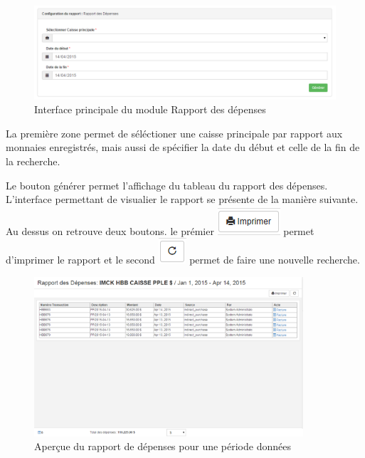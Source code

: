 \documentclass[12pt,a4paper]{report}
\begin{document}
\begin{figure}[h]
\begin{center}
\includegraphics[width=14cm]{pic/RapDepensesInterface.png}
\end{center}
\caption{Interface principale du module Rapport des dépenses}
\label{Interface principale du module Rapport des dépenses}
\end{figure}

La première zone permet de séléctioner une caisse principale par rapport aux monnaies enregistrés, mais aussi de spécifier la date du début et celle de la fin de la recherche. 

Le bouton générer permet l'affichage du tableau du rapport des dépenses. L'interface permettant de visualier le rapport se présente de la manière suivante. Au dessus on retrouve deux boutons. le prémier 
\includegraphics[scale=0.7]{pic/Print.png} permet d'imprimer le rapport et le second \includegraphics[scale=0.7]{pic/refresh.png} permet de faire une nouvelle recherche.

\begin{figure}[h]
\begin{center}
\includegraphics[width=10cm]{pic/RapDepensesApercue.png}
\end{center}
\caption{Aperçue du rapport de dépenses pour une période données}
\label{Aperçue du rapport de dépenses pour une période données}
\end{figure}
\end{document}
